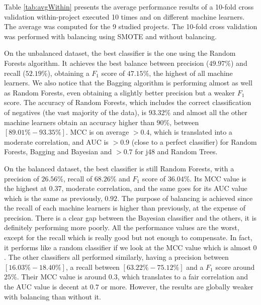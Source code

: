 Table \ref{tab:avgWithin} presents the average performance results of a 10-fold cross validation within-project executed 10 times and on different machine learners. The average was computed for the 9 studied projects. The 10-fold cross validation was performed with balancing using SMOTE and without balancing.

On the unbalanced dataset, the best classifier is the one using the Random Forests algorithm. It achieves the best balance between precision ($49.97\%$) and recall ($52.19\%$), obtaining a $F_{1}$ score of $47.15\%$, the highest of all machine learners. We also notice that the Bagging algorithm is performing almost as well as Random Forests, even obtaining a slightly better precision but a weaker $F_{1}$ score. The accuracy of Random Forests, which includes the correct classification of negatives (the vast majority of the data), is $93.32\%$ and almost all the other machine learners obtain an accuracy higher than $90\%$, between $[89.01\%-93.35\%]$. MCC is on average $>0.4$, which is translated into a moderate correlation, and AUC is $>0.9$ (close to a perfect classifier) for Random Forests, Bagging and Bayesian and $>0.7$ for j48 and Random Trees.

On the balanced dataset, the best classifier is still Random Forests, with a precision of $26.56\%$, recall of $68.26\%$ and $F_{1}$ score of $36.04\%$. Its MCC value is the highest at $0.37$, moderate correlation, and the same goes for its AUC value which is the same as previously, $0.92$. The purpose of balancing is achieved since the recall of each machine learners is higher than previously, at the expense of precision. There is a clear gap between the Bayesian classifier and the others, it is definitely performing more poorly. All the performance values are the worst, except for the recall which is really good but not enough to compensate. In fact, it performs like a random classifier if we look at the MCC value which is almost $0$. The other classifiers all performed similarly, having a precision between $[16.03\%-18.40\%]$, a recall between $[63.22\%-75.12\%]$ and a $F_{1}$ score around $25\%$. Their MCC value is around $0.3$, which translates to a fair correlation and the AUC value is decent at $0.7$ or more. However, the results are globally weaker with balancing than without it.

